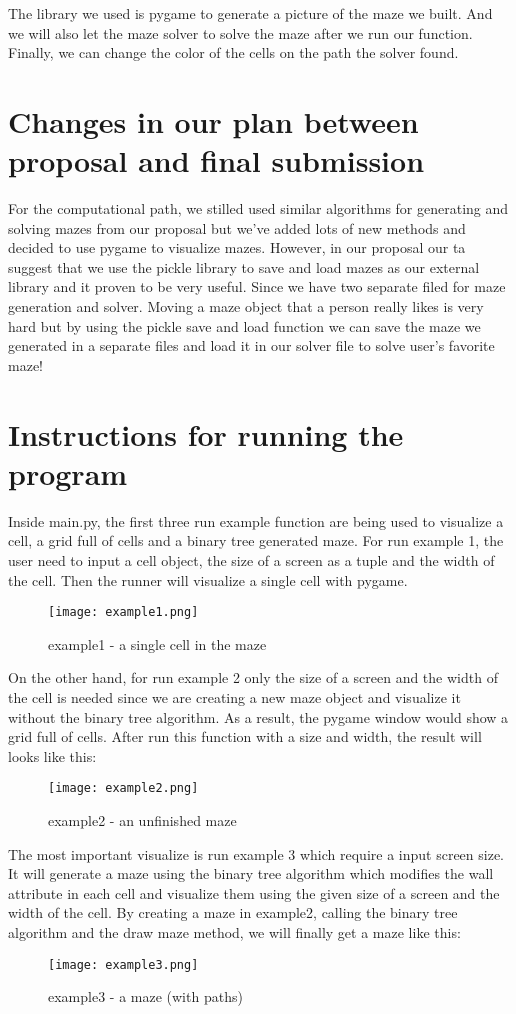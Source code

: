 \documentclass[fontsize=11pt]{article}
\begin{document}
The library we used is pygame to generate a picture of the maze we built. And we will also let the maze solver to solve the maze after we run our function. Finally, we can change the color of the cells on the path the solver found.


\section*{Changes in our plan between proposal and final submission}
For the computational path, we stilled used similar algorithms for generating and solving mazes from our proposal but we've added lots of new methods and decided to use pygame to visualize mazes. However, in our proposal our ta suggest that we use the pickle library to save and load mazes as our external library and it proven to be very useful. Since we have two separate filed for maze generation and solver. Moving a maze object that a person really likes is very hard but by using the pickle save and load function we can save the maze we generated in a separate files and load it in our solver file to solve user's favorite maze!


\section*{Instructions for running the program}
Inside main.py, the first three run example function are being used to visualize a cell, a grid full of cells and a binary tree generated maze.  For run example 1, the user need to input a cell object, the size of a screen as a tuple and the width of the cell. Then the runner will visualize a single cell with pygame.
\begin{figure}[ht]
\centering
\texttt{[image: example1.png]}
\caption{example1 - a single cell in the maze}
\label{fig:label}
\end{figure}


On the other hand, for run example 2 only the size of a screen and the width of the cell is needed since we are creating a new maze object and visualize it without the binary tree algorithm. As a result, the pygame window would show a grid full of cells. After run this function with a size and width, the result will looks like this:
\begin{figure}[ht]
\centering
\texttt{[image: example2.png]}
\caption{example2 - an unfinished maze}
\label{fig:label}
\end{figure}

\newpage
The most important visualize is run example 3 which require a input screen size. It will generate a maze using the binary tree algorithm which modifies the wall attribute in each cell and visualize them using the given size of a screen and the width of the cell. By creating a maze in example2, calling the binary tree algorithm and the draw maze method, we will finally get a maze like this:
\begin{figure}[ht]
\centering
\texttt{[image: example3.png]}
\caption{example3 - a maze (with paths)}
\label{fig:label}
\end{figure}
\end{document}
